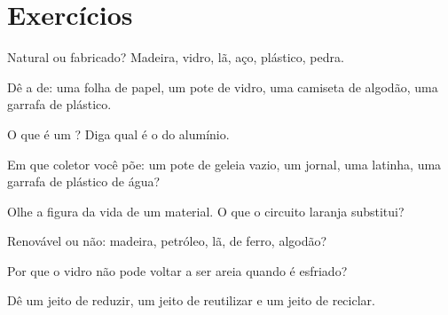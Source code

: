 \section{Exercícios}

\begin{exercise}[$\star$]\label{exo:g5:raw-materials-and-recycling:1}
Natural ou fabricado? Madeira, vidro, lã, aço, plástico, pedra.
\end{exercise}

\begin{exercise}[$\star$]\label{exo:g5:raw-materials-and-recycling:2}
Dê a  de: uma folha de papel, um pote de vidro, uma
camiseta de algodão, uma garrafa de plástico.
\end{exercise}

\begin{exercise}[$\star$]\label{exo:g5:raw-materials-and-recycling:3}
O que é um ? Diga qual é o  do alumínio.
\end{exercise}

\begin{exercise}[$\star$]\label{exo:g5:raw-materials-and-recycling:4}
Em que coletor você põe: um pote de geleia vazio, um jornal, uma
latinha, uma garrafa de plástico de água?
\end{exercise}

\begin{exercise}[$\star$]\label{exo:g5:raw-materials-and-recycling:5}
Olhe a figura da vida de um material. O que o circuito laranja
substitui?
\end{exercise}

\begin{exercise}[$\star$]\label{exo:g5:raw-materials-and-recycling:6}
Renovável ou não: madeira, petróleo, lã,  de ferro, algodão?
\end{exercise}

\begin{exercise}[$\star$]\label{exo:g5:raw-materials-and-recycling:7}
Por que o vidro não pode voltar a ser areia quando é esfriado?
\end{exercise}

\begin{exercise}[$\star$]\label{exo:g5:raw-materials-and-recycling:8}
Dê um jeito de reduzir, um jeito de reutilizar e um jeito de reciclar.
\end{exercise}

